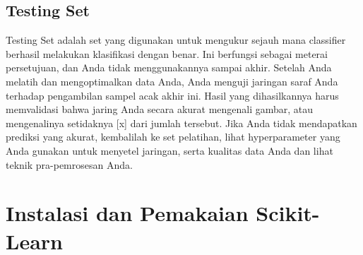 \subsection{Testing Set}
Testing Set adalah set yang digunakan untuk mengukur sejauh mana classifier berhasil melakukan klasifikasi dengan benar. Ini berfungsi sebagai meterai persetujuan, dan Anda tidak menggunakannya sampai akhir. Setelah Anda melatih dan mengoptimalkan data Anda, Anda menguji jaringan saraf Anda terhadap pengambilan sampel acak akhir ini. Hasil yang dihasilkannya harus memvalidasi bahwa jaring Anda secara akurat mengenali gambar, atau mengenalinya setidaknya [x] dari jumlah tersebut. Jika Anda tidak mendapatkan prediksi yang akurat, kembalilah ke set pelatihan, lihat hyperparameter yang Anda gunakan untuk menyetel jaringan, serta kualitas data Anda dan lihat teknik pra-pemrosesan Anda.

\section{Instalasi dan Pemakaian Scikit-Learn}
